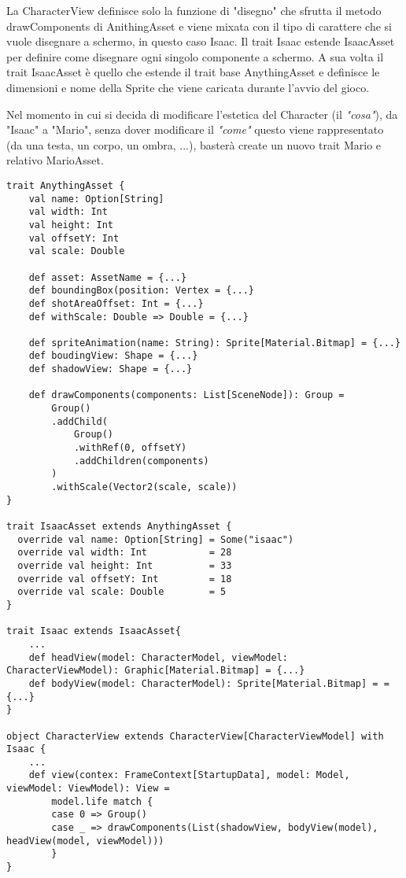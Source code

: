 La CharacterView definisce solo la funzione di "disegno" che sfrutta il metodo drawComponents di AnithingAsset 
e viene mixata con il tipo di carattere che si vuole disegnare a schermo, in questo caso Isaac.
Il trait Isaac estende IsaacAsset per definire come disegnare ogni singolo componente a schermo.
A sua volta il trait IsaacAsset è quello che estende il trait base AnythingAsset 
e definisce le dimensioni e nome della Sprite che viene caricata durante l'avvio del gioco.

Nel momento in cui si decida di modificare l'estetica del Character (il \textit{"cosa"}), da "Isaac" a "Mario",
senza dover modificare il \textit{"come"} questo viene rappresentato (da una testa, un corpo, un ombra, ...),
basterà create un nuovo trait Mario e relativo MarioAsset.

\begin{lstlisting}[basicstyle=\tiny]
trait AnythingAsset {
	val name: Option[String]
	val width: Int
	val height: Int
	val offsetY: Int
	val scale: Double
	
	def asset: AssetName = {...}
	def boundingBox(position: Vertex = {...}
	def shotAreaOffset: Int = {...}
	def withScale: Double => Double = {...}
	
	def spriteAnimation(name: String): Sprite[Material.Bitmap] = {...}
	def boudingView: Shape = {...}
	def shadowView: Shape = {...}
	
	def drawComponents(components: List[SceneNode]): Group =
		Group()
		.addChild(
			Group()
			.withRef(0, offsetY)
			.addChildren(components)
		)
		.withScale(Vector2(scale, scale))
}

trait IsaacAsset extends AnythingAsset {
  override val name: Option[String] = Some("isaac")
  override val width: Int           = 28
  override val height: Int          = 33
  override val offsetY: Int         = 18
  override val scale: Double        = 5
}

trait Isaac extends IsaacAsset{
	...
	def headView(model: CharacterModel, viewModel: CharacterViewModel): Graphic[Material.Bitmap] = {...}
	def bodyView(model: CharacterModel): Sprite[Material.Bitmap] = = {...}
}

object CharacterView extends CharacterView[CharacterViewModel] with Isaac {
	...
	def view(contex: FrameContext[StartupData], model: Model, viewModel: ViewModel): View =
		model.life match {
		case 0 => Group()
		case _ => drawComponents(List(shadowView, bodyView(model), headView(model, viewModel)))
		}
}
\end{lstlisting}	


